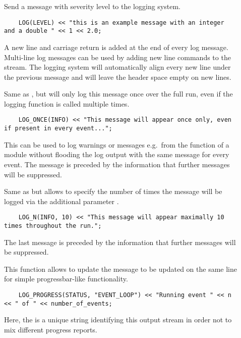 \begin{description}
    \item[] Send a message with severity level  to the logging system.
    \begin{verbatim}
    LOG(LEVEL) << "this is an example message with an integer and a double " << 1 << 2.0;
    \end{verbatim}
    A new line and carriage return is added at the end of every log message.
    Multi-line log messages can be used by adding new line commands to the stream. The logging system will automatically align every new line under the previous message and will leave the header space empty on new lines.
    \item[] Same as , but will only log this message once over the full run, even if the logging function is called multiple times.
    \begin{verbatim}
    LOG_ONCE(INFO) << "This message will appear once only, even if present in every event...";
    \end{verbatim}
    This can be used to log warnings or messages e.g.\ from the  function of a module without flooding the log output with the same message for every event.
    The message is preceded by the information that further messages will be suppressed.
    \item[] Same as  but allows to specify the number of times the message will be logged via the additional parameter .
    \begin{verbatim}
    LOG_N(INFO, 10) << "This message will appear maximally 10 times throughout the run.";
    \end{verbatim}
    The last message is preceded by the information that further messages will be suppressed.
    \item[] This function allows to update the message to be updated on the same line for simple progressbar-like functionality.
    \begin{verbatim}
    LOG_PROGRESS(STATUS, "EVENT_LOOP") << "Running event " << n << " of " << number_of_events;
    \end{verbatim}
    Here, the  is a unique string identifying this output stream in order not to mix different progress reports.
\end{description}

